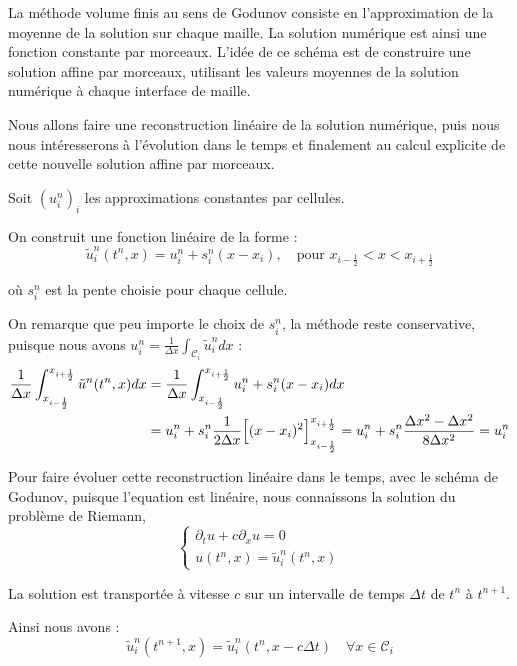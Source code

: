La méthode volume finis au sens de Godunov consiste en l'approximation de la moyenne de la solution sur chaque maille. La solution numérique est ainsi une fonction constante par morceaux. 
L'idée de ce schéma est de construire une solution affine par morceaux, utilisant les valeurs moyennes de la solution numérique à chaque interface de maille.

Nous allons faire une reconstruction linéaire de la solution numérique, puis nous nous intéresserons à l'évolution dans le temps et finalement au calcul explicite de cette nouvelle solution affine par morceaux.

\vspace{1em}

Soit $(u_i^n)_i$ les approximations constantes par cellules.

On construit une fonction linéaire de la forme :
$$\tilde{u}_i^n (t^n,x) = u_i^n + s_i^n(x - x_i), \quad \text{pour } x_{i-\frac{1}{2}} < x <x_{i+\frac{1}{2}} $$

où $s_i^n$ est la pente choisie pour chaque cellule.

On remarque que peu importe le choix de $s_i^n$, la méthode reste conservative, puisque nous avons $u_i^n = \frac{1}{\Delta x} \int_{\mathcal{C}_i}\tilde{u}_i^n dx$ :
\begin{equation*}
\begin{split}
    \frac{1}{\Delta x} \int_{x_{i-\frac{1}{2}}}^{x_{i+\frac{1}{2}}} \tilde{u}^n(t^n,x) dx &= \frac{1}{\Delta x} \int_{x_{i- \frac{1}{2}}}^{x_{i+\frac{1}{2}}} u_i^n + s_i^n (x - x_i) dx \\
    &= u_i^n + s_i^n\frac{1}{2\Delta x} \Bigl[ (x - x_i)^2 \Bigr]_{x_{i-\frac{1}{2}}}^{x_{i+\frac{1}{2}}} = u_i^n + s_i^n\frac{\Delta x^2 - \Delta x^2}{8\Delta x^2} = u_i^n
\end{split}
\end{equation*}

Pour faire évoluer cette reconstruction linéaire dans le temps, avec le schéma de Godunov, puisque l'equation est linéaire, nous connaissons la solution du problème de Riemann, 
$$\begin{cases}
    \partial_tu + c\partial_xu = 0 \\
    u(t^n,x) = \tilde{u}_i^n(t^n,x)
\end{cases}$$

La solution est transportée à vitesse $c$ sur un intervalle de temps 
$\Delta t$ de $t^n$ à $t^{n+1}$.

Ainsi nous avons :
$$\tilde{u}_i^n(t^{n+1},x) = \tilde{u}_i^n(t^n,x - c\Delta t) \quad \forall x \in \mathcal{C}_i$$

